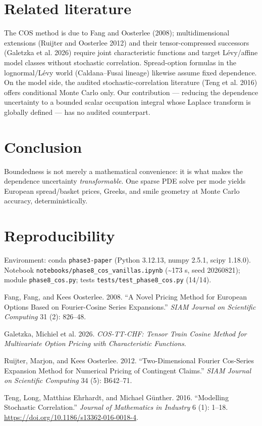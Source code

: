 \documentclass[
  english,
  10pt,
  letterpaper,
  DIV=11,
  numbers=noendperiod]{scrartcl}
\newlength{\cslhangindent}
\newenvironment{CSLReferences}[2] %
 {\begin{list}{}{%
  \setlength{\itemindent}{0pt}
  \setlength{\leftmargin}{0pt}
  \setlength{\parsep}{0pt}
  \ifodd #1
   \setlength{\leftmargin}{\cslhangindent}
   \setlength{\itemindent}{-1\cslhangindent}
  \fi
  \setlength{\itemsep}{#2\baselineskip}}}
 {\end{list}}
\begin{document}
\section{Related literature}\label{sec-related}

The COS method is due to Fang and Oosterlee (2008); multidimensional
extensions (Ruijter and Oosterlee 2012) and their tensor-compressed
successors ({Galetzka et al.} 2026) require joint characteristic
functions and target Lévy/affine model classes without stochastic
correlation. Spread-option formulas in the lognormal/Lévy world
(Caldana--Fusai lineage) likewise assume fixed dependence. On the model
side, the audited stochastic-correlation literature (Teng et al. 2016)
offers conditional Monte Carlo only. Our contribution --- reducing the
dependence uncertainty to a bounded scalar occupation integral whose
Laplace transform is globally defined --- has no audited counterpart.

\section{Conclusion}\label{sec-conclusion}

Boundedness is not merely a mathematical convenience: it is what makes
the dependence uncertainty \emph{transformable}. One sparse PDE solve
per mode yields European spread/basket prices, Greeks, and smile
geometry at Monte Carlo accuracy, deterministically.

\section{Reproducibility}\label{sec-repro}

Environment: conda \texttt{phase3-paper} (Python 3.12.13, numpy 2.5.1,
scipy 1.18.0). Notebook \texttt{notebooks/phase8\_cos\_vanillas.ipynb}
(\textasciitilde173 s, seed 20260821); module \texttt{phase8\_cos.py};
tests \texttt{tests/test\_phase8\_cos.py} (14/14).

\protect{}\label{refs}
\begin{CSLReferences}{1}{1}
Fang, Fang, and Kees Oosterlee. 2008. {``A Novel Pricing Method for
European Options Based on Fourier-Cosine Series Expansions.''}
\emph{SIAM Journal on Scientific Computing} 31 (2): 826--48.

{Galetzka, Michiel et al.} 2026. \emph{COS-TT-CHF: Tensor Train Cosine
Method for Multivariate Option Pricing with Characteristic Functions}.

Ruijter, Marjon, and Kees Oosterlee. 2012. {``Two-Dimensional Fourier
Cos-Series Expansion Method for Numerical Pricing of Contingent
Claims.''} \emph{SIAM Journal on Scientific Computing} 34 (5): B642--71.

Teng, Long, Matthias Ehrhardt, and Michael Günther. 2016. {``Modelling
Stochastic Correlation.''} \emph{Journal of Mathematics in Industry} 6
(1): 1--18. \url{https://doi.org/10.1186/s13362-016-0018-4}.

\end{CSLReferences}
\end{document}
